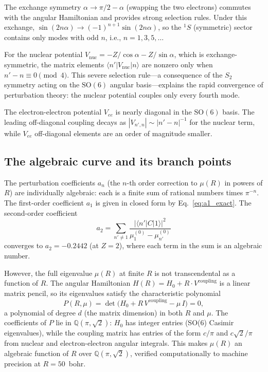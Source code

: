 \documentclass[aps,pra,twocolumn,superscriptaddress,longbibliography]{revtex4-2}
\begin{document}
The exchange symmetry $\alpha \to \pi/2 - \alpha$ (swapping the two
electrons) commutes with the angular Hamiltonian and provides strong
selection rules.  Under this exchange, $\sin(2n\alpha) \to
(-1)^{n+1}\sin(2n\alpha)$, so the ${}^1S$ (symmetric) sector
contains only modes with odd $n$, i.e., $n = 1, 3, 5, \ldots$

For the nuclear potential $V_{\mathrm{nuc}} = -Z/\cos\alpha -
Z/\sin\alpha$, which is exchange-symmetric, the matrix elements
$\langle n' | V_{\mathrm{nuc}} | n \rangle$ are nonzero only when
$n' - n \equiv 0 \pmod{4}$.  This severe selection rule---a
consequence of the $S_2$ symmetry acting on the $\mathrm{SO}(6)$
angular basis---explains the rapid convergence of perturbation
theory: the nuclear potential couples only every fourth mode.

The electron-electron potential $V_{ee}$ is nearly diagonal in the
$\mathrm{SO}(6)$ basis.  The leading off-diagonal coupling decays
as $|V_{n',n}| \sim |n' - n|^{-1}$ for the nuclear term, while
$V_{ee}$ off-diagonal elements are an order of magnitude smaller.

\subsection{The algebraic curve and its branch points}
\label{sec:algebraic_boundary}

The perturbation coefficients $a_n$ (the $n$-th order correction
to $\mu(R)$ in powers of $R$) are individually algebraic: each
is a finite sum of rational numbers times $\pi^{-n}$.  The
first-order coefficient $a_1$ is given in closed form by
Eq.~\eqref{eq:a1_exact}.  The second-order coefficient
\begin{equation}
  a_2 = \sum_{n' \neq 1}
  \frac{|\langle n' | C | 1 \rangle|^2}
  {\mu_1^{(0)} - \mu_{n'}^{(0)}}
  \label{eq:a2_sum}
\end{equation}
converges to $a_2 = -0.2442$ (at $Z = 2$), where each term in the
sum is an algebraic number.

However, the full eigenvalue $\mu(R)$ at finite $R$ is not
transcendental as a function of $R$.  The angular Hamiltonian
$H(R) = H_0 + R \cdot V^{\mathrm{coupling}}$ is a linear matrix
pencil, so its eigenvalues satisfy the characteristic polynomial
\begin{equation}
  P(R, \mu) = \det\!\bigl(H_0 + R\,V^{\mathrm{coupling}} - \mu\,I\bigr)
  = 0,
  \label{eq:char_poly}
\end{equation}
a polynomial of degree $d$ (the matrix dimension) in both $R$ and $\mu$.
The coefficients of $P$ lie in $\mathbb{Q}(\pi, \sqrt{2})$: $H_0$ has
integer entries (SO(6) Casimir eigenvalues), while the coupling matrix
has entries of the form $c/\pi$ and $c\sqrt{2}/\pi$ from nuclear and
electron-electron angular integrals.  This makes $\mu(R)$ an algebraic
function of $R$ over $\mathbb{Q}(\pi, \sqrt{2})$, verified computationally
to machine precision at $R = 50$~bohr.
\end{document}
